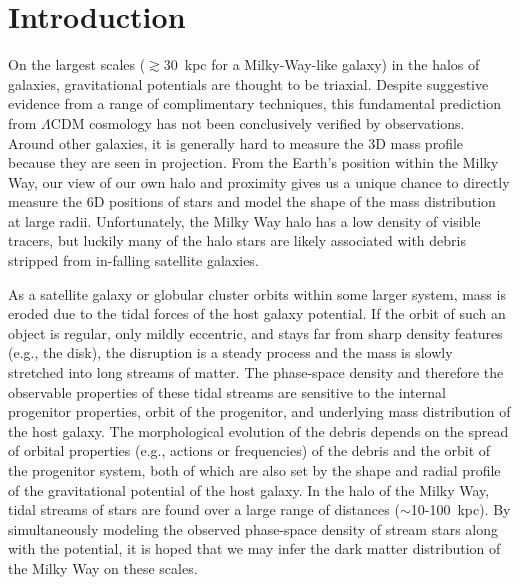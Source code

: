 \documentclass[letterpaper,12pt,preprint]{aastex}
\begin{document}
\keywords{
}


\section{Introduction}\label{sec:introduction}

On the largest scales ($\gtrsim$30~kpc for a Milky-Way-like galaxy) in the halos of galaxies, gravitational potentials are thought to be triaxial. Despite suggestive evidence from a range of complimentary techniques, this fundamental prediction from $\Lambda$CDM cosmology has not been conclusively verified by observations. Around other galaxies, it is generally hard to measure the 3D mass profile because they are seen in projection. From the Earth's position within the Milky Way, our view of our own halo and proximity gives us a unique chance to directly measure the 6D positions of stars and model the shape of the mass distribution at large radii. Unfortunately, the Milky Way halo has a low density of visible tracers, but luckily many of the halo stars are likely associated with debris stripped from in-falling satellite galaxies.

As a satellite galaxy or globular cluster orbits within some larger system, mass is eroded due to the tidal forces of the host galaxy potential. If the orbit of such an object is regular, only mildly eccentric, and stays far from sharp density features (e.g., the disk), the disruption is a steady process and the mass is slowly stretched into long streams of matter. The phase-space density and therefore the observable properties of these tidal streams are sensitive to the internal progenitor properties, orbit of the progenitor, and underlying mass distribution of the host galaxy. The morphological evolution of the debris depends on the spread of orbital properties (e.g., actions or frequencies) of the debris and the orbit of the progenitor system, both of which are also set by the shape and radial profile of the gravitational potential of the host galaxy. In the halo of the Milky Way, tidal streams of stars are found over a large range of distances ($\sim$10-100~kpc). By simultaneously modeling the observed phase-space density of stream stars along with the potential, it is hoped that we may infer the dark matter distribution of the Milky Way on these scales.
\end{document}
